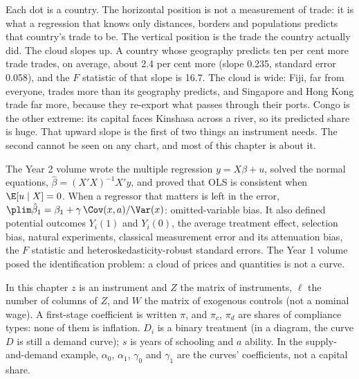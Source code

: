Each dot is a country. The horizontal position is not a measurement of trade:
it is what a regression that knows only distances, borders and populations
predicts that country's trade to be. The vertical position is the trade the
country actually did. The cloud slopes up. A country whose geography predicts
ten per cent more trade trades, on average, about 2.4 per cent more
(slope 0.235, standard error 0.058), and the $F$ statistic of that slope is
16.7. %
The cloud is wide: Fiji, far from everyone, trades more than its geography
predicts, and Singapore and Hong Kong trade far more, because they re-export
what passes through their ports. Congo is the other extreme: its capital faces
Kinshasa across a river, so its predicted share is huge.
That upward slope is the first of two things an instrument needs. The second
cannot be seen on any chart, and most of this chapter is about it.

\begin{recall}
The Year 2 volume wrote the multiple regression $y = X\beta + u$, solved the
normal equations, $\hat\beta = (X'X)^{-1}X'y$, and proved that OLS is
consistent when $\E[u \mid X] = 0$. When a regressor that matters is left in
the error, $\plim \hat\beta_1 = \beta_1 + \gamma\,\Cov(x, a)/\Var(x)$:
omitted-variable bias. It also defined potential outcomes $Y_i(1)$ and
$Y_i(0)$, the average treatment effect, selection bias, natural experiments,
classical measurement error and its attenuation bias, the $F$ statistic and
heteroskedasticity-robust standard errors. The Year 1 volume posed the
identification problem: a cloud of prices and quantities is not a curve.
\end{recall}

\begin{notation}\label{not:b3:instrumental-variables:symbols}
In this chapter $z$ is an instrument and $Z$ the matrix of instruments, $\ell$
the number of columns of $Z$, and $W$ the matrix of exogenous controls (not a
nominal wage). A first-stage coefficient is written $\pi$, and $\pi_c$, $\pi_d$
are shares of compliance types: none of them is inflation. $D_i$ is a binary
treatment (in a diagram, the curve $D$ is still a demand curve); $s$ is years
of schooling and $a$ ability. In the supply-and-demand example, $\alpha_0$,
$\alpha_1$, $\gamma_0$ and $\gamma_1$ are the curves' coefficients, not a capital share.
\end{notation}

